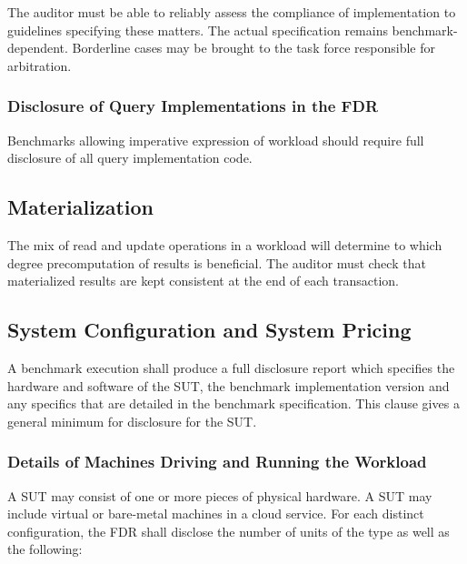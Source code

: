 The auditor must be able to reliably assess the compliance of implementation to guidelines specifying these matters. The actual specification remains benchmark-dependent. Borderline cases may be brought to the task force responsible for arbitration.


\subsubsection{Disclosure of Query Implementations in the FDR}
Benchmarks allowing imperative expression of workload should require full disclosure of all query implementation code.

\subsection{Materialization}

The mix of read and update operations in a workload will determine to which degree precomputation of results is beneficial. The auditor must check that materialized results are kept consistent at the end of each transaction.

\subsection{System Configuration and System Pricing}
\label{sec:system-config}


A benchmark execution shall produce a full disclosure report which specifies the hardware and software of the SUT, the benchmark implementation version and any specifics that are detailed in the benchmark specification. This clause gives a general minimum for disclosure for the SUT.

\subsubsection{Details of Machines Driving and Running the Workload}
A SUT may consist of one or more pieces of physical hardware. A SUT may include virtual or bare-metal machines in a cloud service.
For each distinct configuration, the FDR shall disclose the number of units of the type as well as the following:

